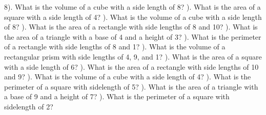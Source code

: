 \documentclass{article}%
\begin{document}
8). What is the volume of a cube with a side length of 8?%
\newline%
\newline%
). What is the area of a square with a side length of 4?%
\newline%
\newline%
). What is the volume of a cube with a side length of 8?%
\newline%
\newline%
). What is the area of a rectangle with side lengths of 8 and 10?%
\newline%
\newline%
). What is the area of a triangle with a base of 4 and a height of 3?%
\newline%
\newline%
). What is the perimeter of a rectangle with side lengths of 8 and 1?%
\newline%
\newline%
). What is the volume of a rectangular prism with side lengths of 4, 9, and 1?%
\newline%
\newline%
). What is the area of a square with a side length of 6?%
\newline%
\newline%
). What is the area of a rectangle with side lengths of 10 and 9?%
\newline%
\newline%
). What is the volume of a cube with a side length of 4?%
\newline%
\newline%
). What is the perimeter of a square with sidelength of 5?%
\newline%
\newline%
). What is the area of a triangle with a base of 9 and a height of 7?%
\newline%
\newline%
). What is the perimeter of a square with sidelength of 2?%
\end{document}

